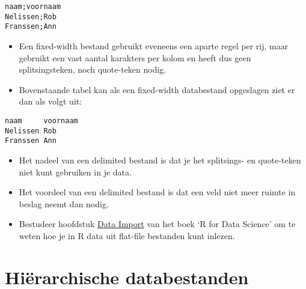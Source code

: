 \documentclass[]{memoir}
\providecommand{\tightlist}{%
  \setlength{\itemsep}{0pt}\setlength{\parskip}{0pt}}
\begin{document}
\begin{verbatim}
naam;voornaam
Nelissen;Rob
Franssen;Ann
\end{verbatim}

\begin{itemize}
\tightlist
\item
  Een fixed-width bestand gebruikt eveneens een aparte regel per rij, maar gebruikt een vast aantal karakters per kolom en heeft dus geen splitsingsteken, noch quote-teken nodig.
\item
  Bovenstaande tabel kan als een fixed-width databestand opgeslagen ziet er dan als volgt uit:
\end{itemize}

\begin{verbatim}
naam     voornaam
Nelissen Rob
Franssen Ann
\end{verbatim}

\begin{itemize}
\tightlist
\item
  Het nadeel van een delimited bestand is dat je het splitsings- en quote-teken niet kunt gebruiken in je data.
\item
  Het voordeel van een delimited bestand is dat een veld niet meer ruimte in beslag neemt dan nodig.
\item
  Bestudeer hoofdstuk \href{http://r4ds.had.co.nz/data-import.html}{Data Import} van het boek `R for Data Science' om te weten hoe je in R data uit flat-file bestanden kunt inlezen.
\end{itemize}

\hypertarget{hierarchische-databestanden-1}{%
\section{Hiërarchische databestanden}\label{hierarchische-databestanden-1}}
\end{document}
